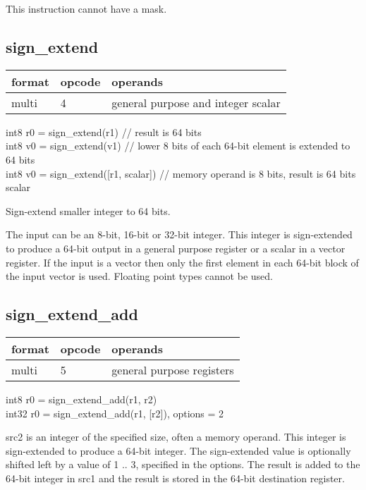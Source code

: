 \documentclass[forwardcom.tex]{subfiles}
\begin{document}
This instruction cannot have a mask.
\vv

\subsection{sign\_extend}
\label{table:signExtendInstruction}
\begin{tabular}{|p{12mm}|p{15mm}|p{100mm}|}
\hline
\bfseries format & \bfseries opcode & \bfseries operands \\ \hline
multi & 4 & general purpose and integer scalar \\ \hline
\end{tabular}
\vv

int8 r0 = sign\_extend(r1)  // result is 64 bits\\
int8 v0 = sign\_extend(v1)  // lower 8 bits of each 64-bit element is extended to 64 bits\\
int8 v0 = sign\_extend([r1, scalar]) // memory operand is 8 bits, result is 64 bits scalar
\vv

Sign-extend smaller integer to 64 bits.

\vv
The input can be an 8-bit, 16-bit or 32-bit integer. This integer is sign-extended to produce a 64-bit output in a general purpose register or a scalar in a vector register. If the input is a vector then only the first element in each 64-bit block of the input vector is used. Floating point types cannot be used.

\subsection{sign\_extend\_add}
\label{table:signExtendAddInstruction}
\begin{tabular}{|p{12mm}|p{15mm}|p{100mm}|}
\hline
\bfseries format & \bfseries opcode & \bfseries operands \\ \hline
multi & 5 & general purpose registers \\ \hline
\end{tabular}
\vv

int8 r0 = sign\_extend\_add(r1, r2) \\ 
int32 r0 = sign\_extend\_add(r1, [r2]), options = 2
\vv

src2 is an integer of the specified size, often a memory operand.
This integer is sign-extended to produce a 64-bit integer. 
The sign-extended value is optionally shifted left by a value of 1 .. 3, specified in the options. 
The result is added to the 64-bit integer in src1 and the result is stored in the 64-bit destination register.
\vv
\end{document}
